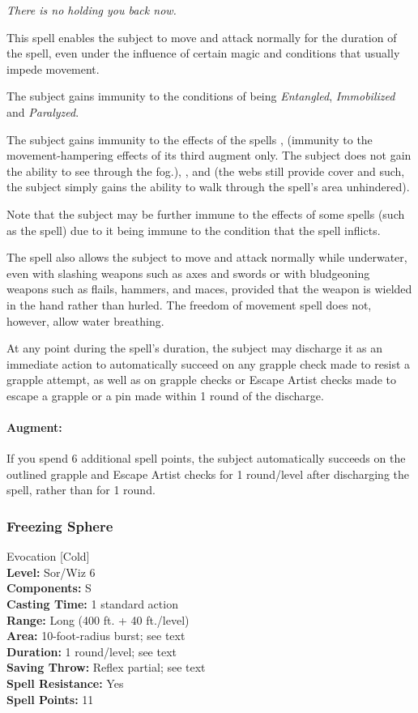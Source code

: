 \emph{There is no holding you back now.}

This spell enables the subject to move and attack normally for the duration of the spell, even under the influence of certain magic and conditions that usually impede movement.
\begin{list}{}{\leftmargin=1em}
 \item The subject gains immunity to the conditions of being \emph{Entangled}, \emph{Immobilized} and \emph{Paralyzed}.
 \item The subject gains immunity to the effects of the spells ,  (immunity to the movement-hampering effects of its third augment only. The subject does not gain the ability to see through the fog.), ,  and  (the webs still provide cover and such, the subject simply gains the ability to walk through the spell's area unhindered).
\end{list}
Note that the subject may be further immune to the effects of some spells (such as the  spell) due to it being immune to the condition that the spell inflicts.

The spell also allows the subject to move and attack normally while underwater, even with slashing weapons such as axes and swords or with bludgeoning weapons such as flails, hammers, and maces, provided that the weapon is wielded in the hand rather than hurled. The freedom of movement spell does not, however, allow water breathing.

At any point during the spell's duration, the subject may discharge it as an immediate action to automatically succeed on any grapple check made to resist a grapple attempt, as well as on grapple checks or Escape Artist checks made to escape a grapple or a pin made within 1 round of the discharge. 

\paragraph{Augment:} If you spend 6 additional spell points, the subject automatically succeeds on the outlined grapple and Escape Artist checks for 1 round/level after discharging the spell, rather than for 1 round.
\subsubsection{Freezing Sphere}
\label{Spell:FreezingSphere}
Evocation [Cold]
\\ \textbf{Level:} Sor/Wiz 6
\\ \textbf{Components:} S
\\ \textbf{Casting Time:} 1 standard action
\\ \textbf{Range:} Long (400 ft. + 40 ft./level)
\\ \textbf{Area:} 10-foot-radius burst; see text
\\ \textbf{Duration:} 1 round/level; see text
\\ \textbf{Saving Throw:} Reflex partial; see text
\\ \textbf{Spell Resistance:} Yes
\\ \textbf{Spell Points:} 11

